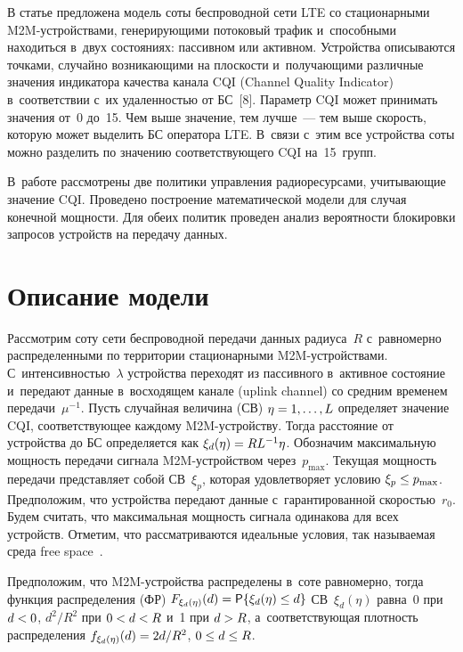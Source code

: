 \begin{multicols}{2}
  В статье предложена модель соты беспроводной сети LTE со стационарными 
M2M-устрой\-ст\-ва\-ми, генерирующими потоковый трафик и~способными 
находиться в~двух состояниях: пассивном или активном. Устройства 
описываются точками, случайно возникающими на плоскости и~получающими 
различные значения индикатора качества канала CQI (Channel Quality Indicator) 
в~соответствии с~их удаленностью от БС~[8]. Параметр CQI может принимать 
значения от~0 до~15. Чем выше значение, тем лучше~--- тем выше скорость, 
которую может выделить БС оператора LTE. В~связи с~этим все устройства 
соты можно разделить по значению соответствующего CQI на~15~групп. 

В~работе рассмотрены две политики управления радиоресурсами, 
учитывающие значение CQI. Проведено по\-стро\-ение математической модели 
для случая конечной мощности. Для обеих политик проведен анализ 
вероятности блокировки запросов устройств на передачу данных.
  
\section{Описание модели}

  Рассмотрим соту сети беспроводной передачи данных радиуса~$R$ 
с~равномерно распределенными по территории стационарными  
M2M-устрой\-ст\-ва\-ми. С~интенсивностью~$\lambda$ устройства переходят 
из пассивного в~активное состояние и~передают данные в~восходящем канале 
(uplink channel) со средним временем передачи~$\mu^{-1}$. Пусть случайная 
величина (СВ) $\eta\hm=1,\ldots ,L$ определяет значение CQI, соответствующее 
каждому M2M-устрой\-ст\-ву. Тогда расстояние от устройства до БС 
определяется как $\xi_d(\eta)\hm=RL^{-1}\eta$. Обозначим максимальную 
мощность передачи сигнала M2M-устрой\-ст\-вом через~$p_{\max}$. Текущая 
мощ\-ность передачи пред\-став\-ля\-ет собой СВ~$\xi_p$, которая удовлетворяет 
условию $\xi_p\hm\leq p_{\max}$. Предположим, что устройства передают 
данные с~гарантированной скоростью~$r_0$. Будем считать, что максимальная 
мощность сигнала одинакова для всех устройств. Отметим, что 
рассматриваются идеальные условия, так называемая среда free  
space~\cite{9-gud}. 
  
  Предположим, что M2M-устрой\-ст\-ва распределены в~соте равномерно, 
тогда функция распределения (ФР) ${F}_{\xi_d(\eta)}(d)\hm= 
{\sf P}\{\xi_d(\eta)\leq d\}$ СВ~$\xi_d(\eta)$ равна~0 при $d\hm<0$, 
$d^2/R^2$ при $0\hm < d\hm < R$ и~1 при $d\hm > R$, 
а~соответствующая плотность распределения $f_{\xi_d(\eta)}(d)\hm= 2d/R^2$, 
$0\hm\leq d\hm\leq R$.
  

\end{multicols}
